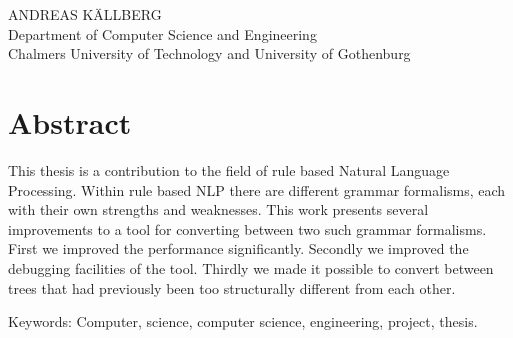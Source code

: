 \oneLineTitle\\
\oneLineSubtitle\\
ANDREAS KÄLLBERG\\
Department of Computer Science and Engineering\\
Chalmers University of Technology and University of Gothenburg

\thispagestyle{plain}			%
\section*{Abstract}
This thesis is a contribution to the field of rule based Natural Language Processing. Within rule based NLP there are different grammar formalisms, each with their own strengths and weaknesses. This work presents several improvements to a tool for converting between two such grammar formalisms. First we improved the performance significantly. Secondly we improved the debugging facilities of the tool. Thirdly we made it possible to convert between trees that had previously been too structurally different from each other.

\vfill
Keywords: Computer, science, computer science, engineering, project, thesis.

\newpage				%
\thispagestyle{empty}
\mbox{}
